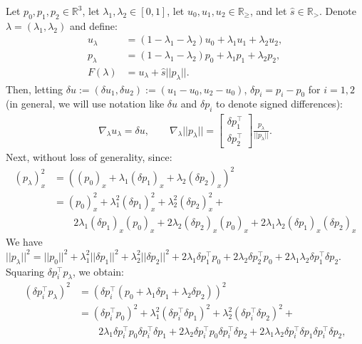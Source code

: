\documentclass{article}
\begin{document}
Let $p_0, p_1, p_2 \in \mathbb{R}^3$, let
$\lambda_1, \lambda_2 \in [0, 1]$, let
$u_0, u_1, u_2 \in \mathbb{R}_{\geq}$, and let
$\hat{s} \in \mathbb{R}_{>}$. Denote
$\lambda = (\lambda_1, \lambda_2)$ and define:
\begin{align*}
  u_\lambda &= (1 - \lambda_1 - \lambda_2) u_0 + \lambda_1 u_1 + \lambda_2 u_2, \\
  p_\lambda &= (1 - \lambda_1 - \lambda_2) p_0 + \lambda_1 p_1 + \lambda_2 p_2, \\
  F(\lambda) &= u_\lambda + \hat{s} ||p_\lambda||.
\end{align*}
Then, letting
$\delta u := (\delta u_1, \delta u_2) := (u_1 - u_0, u_2 - u_0)$,
$\delta p_i = p_i - p_0$ for $i = 1, 2$ (in general, we will use
notation like $\delta u$ and $\delta p_i$ to denote signed
differences):
\begin{align*}
  \nabla_\lambda u_\lambda = \delta u, \qquad \nabla_\lambda ||p_\lambda|| = \begin{bmatrix} \delta p_1^\top \\ \delta p_2^\top \end{bmatrix} \frac{p_\lambda}{||p_\lambda||}.
\end{align*}
Next, without loss of generality, since:
\begin{align*}
  {(p_\lambda)}_x^2
  &= \left({(p_0)}_x + \lambda_1 {(\delta p_1)}_x + \lambda_2 {(\delta p_2)}_x\right)^2 \\
  &= {(p_0)}_x^2 + \lambda_1^2 {(\delta p_1)}_x^2 + \lambda_2^2 {(\delta p_2)}_x^2 + \\
  &\qquad 2 \lambda_1 {(\delta p_1)}_x {(p_0)}_x + 2 \lambda_2 {(\delta p_2)}_x {(p_0)}_x + 2 \lambda_1 \lambda_2 {(\delta p_1)}_x {(\delta p_2)}_x
\end{align*}
We have
$||p_\lambda||^2 = ||p_0||^2 + \lambda_1^2 ||\delta p_1||^2 +
\lambda_2^2 ||\delta p_2||^2 + 2 \lambda_1 \delta p_1^\top p_0 + 2
\lambda_2 \delta p_2^\top p_0 + 2 \lambda_1 \lambda_2 \delta p_1^\top
\delta p_2$. Squaring $\delta p_i^\top p_\lambda$, we obtain:
\begin{align*}
  {(\delta p_i^\top p_\lambda)}^2
  &= \left(\delta p_i^\top (p_0 + \lambda_1 \delta p_1 + \lambda_2 \delta p_2)\right)^2 \\
  &= {(\delta p_i^\top p_0)}^2 + \lambda_1^2 {(\delta p_i^\top \delta p_1)}^2 + \lambda_2^2 {(\delta p_i^\top \delta p_2)}^2 + \\
  &\qquad 2 \lambda_1 \delta p_i^\top p_0 \delta p_i^\top \delta p_1 + 2 \lambda_2 \delta p_i^\top p_0 \delta p_i^\top \delta p_2  + 2 \lambda_1 \lambda_2 \delta p_i^\top \delta p_1 \delta p_i^\top \delta p_2,
\end{align*}
\end{document}
